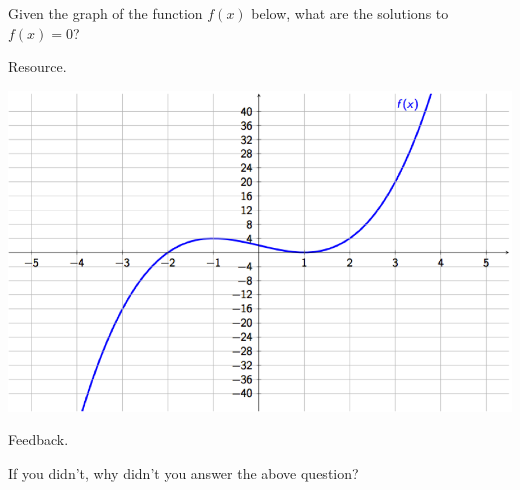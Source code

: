 \documentclass{ximera}
\begin{document}
\begin{problem} 
    Given the graph of the function $f(x)$ below, what are the solutions to $f(x) = 0$?
    
    \begin{hint}
    Resource.
    \end{hint}
       
\begin{center} \includegraphics[scale=0.7]{Graphing1.png} \end{center}
    
  \begin{multipleChoice}
      
     \begin{feedback}[attempt]
      Feedback.
      \end{feedback}
     
  \end{multipleChoice}
  
  If you didn't, why didn't you answer the above question?
  
  \begin{multipleChoice}
  \end{multipleChoice}
\end{problem}
\end{document}
